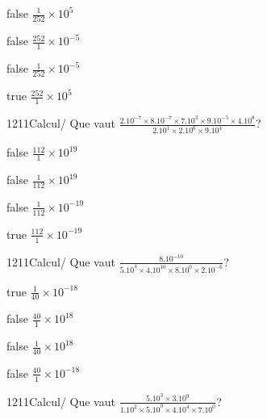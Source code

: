 \documentclass[11pt]{article}
\begin{document}
            \begin{reponses}
                \item[false] $\frac{1}{252}\times 10^{5}$
                \item[false] $\frac{252}{1}\times 10^{-5}$
                \item[false] $\frac{1}{252}\times 10^{-5}$
                \item[true] $\frac{252}{1}\times 10^{5}$
            \end{reponses}
            
            \begin{question}{1211}{Calcul}{}{/}
                Que vaut $\frac{2.10^{-7}\times 8.10^{-7}\times 7.10^{3}\times 9.10^{-5}\times 4.10^{8}}{2.10^{1}\times 2.10^{6}\times 9.10^{4}}$?
            \end{question}
            
            \begin{reponses}
                \item[false] $\frac{112}{1}\times 10^{19}$
                \item[false] $\frac{1}{112}\times 10^{19}$
                \item[false] $\frac{1}{112}\times 10^{-19}$
                \item[true] $\frac{112}{1}\times 10^{-19}$
            \end{reponses}
            
            \begin{question}{1211}{Calcul}{}{/}
                Que vaut $\frac{8.10^{-10}}{5.10^{4}\times 4.10^{10}\times 8.10^{0}\times 2.10^{-6}}$?
            \end{question}
            
            \begin{reponses}
                \item[true] $\frac{1}{40}\times 10^{-18}$
                \item[false] $\frac{40}{1}\times 10^{18}$
                \item[false] $\frac{1}{40}\times 10^{18}$
                \item[false] $\frac{40}{1}\times 10^{-18}$
            \end{reponses}
            
            \begin{question}{1211}{Calcul}{}{/}
                Que vaut $\frac{5.10^{3}\times 3.10^{9}}{1.10^{2}\times 5.10^{0}\times 4.10^{4}\times 7.10^{0}}$?
            \end{question}
            
\end{document}
